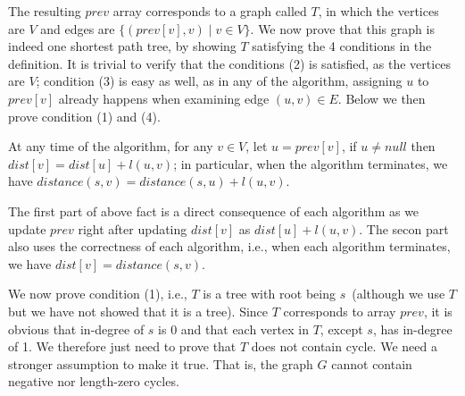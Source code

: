 \begin{algorithmblock}[0.8\textwidth]
	\xxx
	\xxx
	\xxx
	\aab {\textcolor{blue}{$prev[v] = null$, for any $v\in V$};}\xxx
	\xxx
	\xxx
	\xxx
\end{algorithmblock}

\begin{algorithmblock}[0.8\textwidth]
	\xxx
	\xxx
	\xxx
	\aac {\textcolor{blue}{$prev[v]= u$};}\xxx
\end{algorithmblock}


The resulting $prev$ array corresponds to a graph called $T$, in which the vertices are $V$
and edges are $\{(prev[v], v)\mid v\in V\}$. We now prove that this graph is indeed one shortest path tree,
by showing $T$ satisfying the 4 conditions in the definition. It is trivial to verify that the conditions (2)
is satisfied, as the vertices are $V$; condition (3) is easy as well, as in any of the algorithm,
assigning $u$ to $prev[v]$ already happens when examining edge $(u,v)\in E$.
Below we then prove condition (1) and (4).

\begin{fact}
\label{tree-fact2}
At any time of the algorithm, for any $v\in V$, let $u = prev[v]$, if $u\neq null$ then $dist[v] = dist[u] + l(u,v)$;
in particular, when the algorithm terminates, we have $distance(s,v) = distance(s,u) + l(u,v)$.
\end{fact}
The first part of above fact is a direct consequence of each algorithm as we update $prev$ right after updating $dist[v]$ as $dist[u] + l(u,v)$.
The secon part also uses the correctness of each algorithm, i.e., when each algorithm terminates, we have $dist[v] = distance(s,v)$.

We now prove condition (1), i.e., $T$ is a tree with root being $s$~(although we use $T$ but we have not showed that it is a tree).
Since $T$ corresponds to array $prev$, it is obvious that in-degree of $s$ is 0 and that each vertex in $T$, except $s$,
has in-degree of 1. We therefore just need to prove that $T$ does not contain cycle. 
We need a stronger assumption to make it true. That is, the graph $G$ cannot contain negative nor length-zero cycles.


